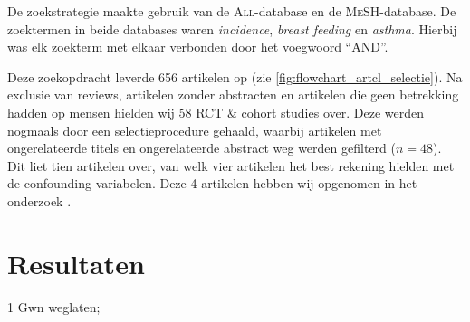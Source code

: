 \documentclass[abstract=true]{scrartcl}
\begin{document}
    De zoekstrategie maakte gebruik van de \textsc{All}-database en de \textsc{MeSH}-database. De zoektermen in beide databases waren \emph{incidence}, \emph{breast feeding} en \emph{asthma}. Hierbij was elk zoekterm met elkaar verbonden door het voegwoord ``\uppercase{and}''.

Deze zoekopdracht leverde 656 artikelen op (zie \cref{fig:flowchart_artcl_selectie}). Na exclusie van reviews, artikelen zonder abstracten en artikelen die geen betrekking hadden op mensen hielden wij 58 RCT \& cohort studies over. Deze werden nogmaals door een selectieprocedure gehaald, waarbij artikelen met ongerelateerde titels en ongerelateerde abstract weg werden gefilterd ($n = 48$).
Dit liet tien artikelen over, van welk vier artikelen het best rekening hielden met de confounding variabelen. Deze 4 artikelen hebben wij opgenomen  in het onderzoek \cite{chandra1997five,den_Dekker_2016,oddy1999association,dell2001breastfeeding}.



\section{Resultaten}
\begin{table}
   \centering
   \begin{threeparttable}
\begin{tablenotes}
\item[1]Gwn weglaten;
\end{tablenotes}

\end{threeparttable}
\label{tab:overzicht_artcls}
\end{table}
\end{document}
